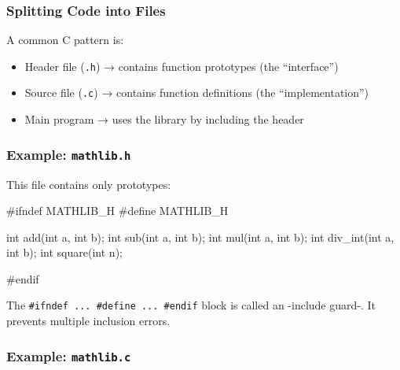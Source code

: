 \documentclass[
  letterpaper,
  DIV=11,
  numbers=noendperiod]{scrreprt}
\newenvironment{Shaded}{\begin{snugshade}}{\end{snugshade}}
\newcommand{\DataTypeTok}[1]{\textcolor[rgb]{0.68,0.00,0.00}{#1}}
\newcommand{\NormalTok}[1]{\textcolor[rgb]{0.00,0.23,0.31}{#1}}
\newcommand{\OperatorTok}[1]{\textcolor[rgb]{0.37,0.37,0.37}{#1}}
\newcommand{\PreprocessorTok}[1]{\textcolor[rgb]{0.68,0.00,0.00}{#1}}
\providecommand{\tightlist}{%
  \setlength{\itemsep}{0pt}\setlength{\parskip}{0pt}}
\begin{document}
\subsubsection{Splitting Code into
Files}\label{splitting-code-into-files}

A common C pattern is:

\begin{itemize}
\tightlist
\item
  Header file (\texttt{.h}) → contains function prototypes (the
  ``interface'')
\item
  Source file (\texttt{.c}) → contains function definitions (the
  ``implementation'')
\item
  Main program → uses the library by including the header
\end{itemize}

\subsubsection{\texorpdfstring{Example:
\texttt{mathlib.h}}{Example: mathlib.h}}\label{example-mathlib.h}

This file contains only prototypes:

\begin{Shaded}
\begin{Highlighting}[]
\PreprocessorTok{\#ifndef MATHLIB\_H}
\PreprocessorTok{\#define MATHLIB\_H}

\DataTypeTok{int}\NormalTok{ add}\OperatorTok{(}\DataTypeTok{int}\NormalTok{ a}\OperatorTok{,} \DataTypeTok{int}\NormalTok{ b}\OperatorTok{);}
\DataTypeTok{int}\NormalTok{ sub}\OperatorTok{(}\DataTypeTok{int}\NormalTok{ a}\OperatorTok{,} \DataTypeTok{int}\NormalTok{ b}\OperatorTok{);}
\DataTypeTok{int}\NormalTok{ mul}\OperatorTok{(}\DataTypeTok{int}\NormalTok{ a}\OperatorTok{,} \DataTypeTok{int}\NormalTok{ b}\OperatorTok{);}
\DataTypeTok{int}\NormalTok{ div\_int}\OperatorTok{(}\DataTypeTok{int}\NormalTok{ a}\OperatorTok{,} \DataTypeTok{int}\NormalTok{ b}\OperatorTok{);}
\DataTypeTok{int}\NormalTok{ square}\OperatorTok{(}\DataTypeTok{int}\NormalTok{ n}\OperatorTok{);}

\PreprocessorTok{\#endif}
\end{Highlighting}
\end{Shaded}

The \texttt{\#ifndef\ ...\ \#define\ ...\ \#endif} block is called an
-include guard-. It prevents multiple inclusion errors.

\subsubsection{\texorpdfstring{Example:
\texttt{mathlib.c}}{Example: mathlib.c}}\label{example-mathlib.c}
\end{document}
